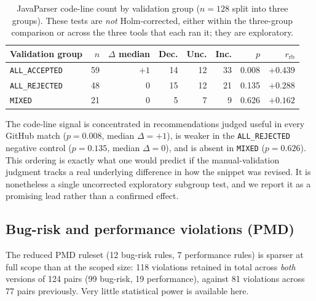 \begin{table}[htbp]
\centering
\caption{JavaParser code-line count by validation group ($n=128$ split into three groups).
These tests are \emph{not} Holm-corrected, either within the three-group comparison or across the three tools that each ran it; they are exploratory.}
\label{tab:ba-full-jp-validation}
\small
\begin{tabular}{lrrrrrrr}
\toprule
Validation group & $n$ & $\Delta$ median & Dec. & Unc. & Inc. & $p$ & $r_{\text{rb}}$ \\
\midrule
\texttt{ALL\_ACCEPTED} & 59 & $+1$ & 14 & 12 & 33 & 0.008 & $+0.439$ \\
\texttt{ALL\_REJECTED} & 48 & $0$  & 15 & 12 & 21 & 0.135 & $+0.288$ \\
\texttt{MIXED}         & 21 & $0$  & 5  & 7  & 9  & 0.626 & $+0.162$ \\
\bottomrule
\end{tabular}
\end{table}

The code-line signal is concentrated in recommendations judged useful in every GitHub match ($p=0.008$, median $\Delta=+1$), is weaker in the \texttt{ALL\_REJECTED} negative control ($p=0.135$, median $\Delta=0$), and is absent in \texttt{MIXED} ($p=0.626$).
This ordering is exactly what one would predict if the manual-validation judgment tracks a real underlying difference in how the snippet was revised.
It is nonetheless a single uncorrected exploratory subgroup test, and we report it as a promising lead rather than a confirmed effect.

\subsection{Bug-risk and performance violations (PMD)}
\label{sec:ba-full-pmd}

The reduced PMD ruleset (12 bug-risk rules, 7 performance rules) is sparser at full scope than at the scoped size: 118 violations retained in total across \emph{both} versions of 124 pairs (99 bug-risk, 19 performance), against 81 violations across 77 pairs previously.
Very little statistical power is available here.

